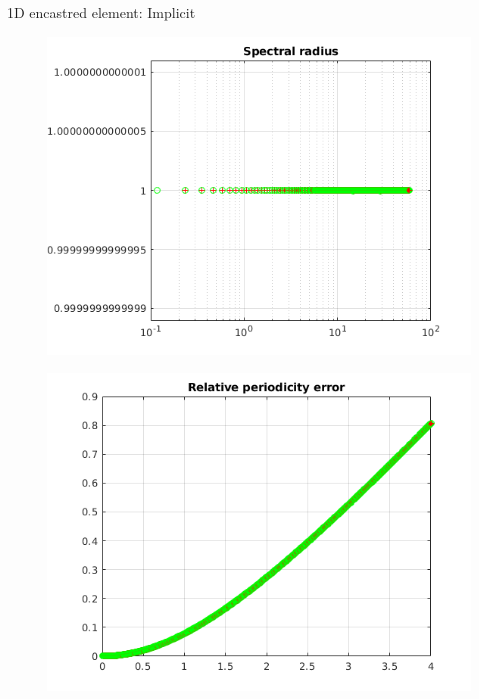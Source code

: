 \begin{frame}{1D encastred element: Implicit}
\begin{figure}[ht]
\begin{minipage}[b]{0.5\linewidth}
  \end{minipage}%
  \begin{minipage}[b]{0.5\linewidth}
    \centering
    \includegraphics[scale=.35]{images/enc-imp-2.png} \\
  \end{minipage} 
  \begin{minipage}[b]{0.5\linewidth}
    \centering
    \includegraphics[scale=.35]{images/enc-imp-3.png} \\


\end{minipage}
\end{figure}
\end{frame}
